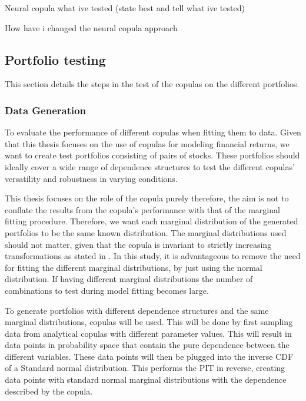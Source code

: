 Neural copula what ive tested (state best and tell what ive tested)

How have i changed the neural copula approach 


\subsection{Portfolio testing}\label{sec:PortfolioTesting}
This section details the steps in the test of the copulas on the different portfolios. 

\subsubsection{Data Generation}
To evaluate the performance of different copulas when fitting them to data. Given that this thesis focuses on the use of copulas for modeling financial returns, we want to create test portfolios consisting of pairs of stocks. These portfolios should ideally cover a wide range of dependence structures to test the different copulas' versatility and robustness in varying conditions. 

This thesis focuses on the role of the copula purely therefore, the aim is not to conflate the results from the copula's performance with that of the marginal fitting procedure. Therefore, we want each marginal distribution of the generated portfolios to be the same known distribution. The marginal distributions used should not matter, given that the copula is invariant to strictly increasing transformations as stated in  . In this study, it is advantageous to remove the need for fitting the different marginal distributions, by just using the normal distribution. If having different marginal distributions the number of combinations to test during model fitting becomes large.  

To generate portfolios with different dependence structures and the same marginal distributions, copulas will be used. This will be done by first sampling data from analytical copulas with different parameter values. This will result in data points in probability space that contain the pure dependence between the different variables. These data points will then be plugged into the inverse \gls{CDF} of a Standard normal distribution. This performs the \gls{PIT} in reverse, creating data points with standard normal marginal distributions with the dependence described by the copula. 

